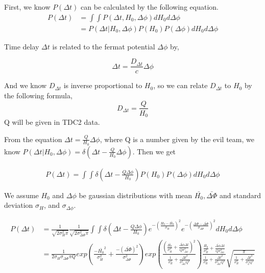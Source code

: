 \documentclass[\docopts]{\docclass}
\begin{document}
First, we know $P(\Delta t)$ can be calculated by the following equation.
\begin{align}
P(\Delta t) &= \int \int P(\Delta t, H_0, \Delta \phi) dH_0 d \Delta \phi \\
&= P(\Delta t | H_0, \Delta \phi) P(H_0)P(\Delta \phi) dH_0 d\Delta \phi
\end{align}

Time delay $\Delta t$ is related to the fermat potential $\Delta \phi$ by, 

\begin{equation}
\Delta t = \frac{D_{\Delta t}}{c} \Delta \phi
\end{equation}

And we know $D_{\Delta t}$ is inverse proportional to $H_0$, so we can relate $D_{\Delta t}$ to $H_0$ by the following formula, 
\begin{equation}
D_{\Delta t}= \frac{Q}{H_0}
\end{equation}
Q will be given in TDC2 data. 

From the equation $\Delta t = \frac{Q}{H_0}\Delta \phi$, where Q is a number given by the evil team, we know 
$P(\Delta t | H_0, \Delta \phi) = \delta(\Delta t - \frac{Q}{H_0}\Delta \phi)$.
Then we get
 
\begin{align}
P(\Delta t) = \int\int \delta(\Delta t - \frac{Q \Delta \phi }{H_0}) P(H_0)P(\Delta \phi) dH_0 d\Delta \phi
\end{align}

We assume $H_0$ and $\Delta \phi$ be gaussian distributions with mean $\bar{H_0}, \bar{\Delta \Phi}$ and standard deviation $\sigma_{H}$, and $\sigma_{\Delta \phi}$. 

\begin{align}
P(\Delta t) &= \frac{1}{\sqrt{2\sigma_{H}^2\pi}}\frac{1}{\sqrt{2\sigma_{\Delta \Phi}^2\pi}}\int\int \delta(\Delta t - \frac{Q \Delta \phi}{H_0}) e^{-(\frac{H_0-\bar{H_0}}{\sigma_{H}})^2} e^{-(\frac{\Delta \Phi-\bar{\Delta \Phi}}{\sigma_{\Delta \Phi}})^2} dH_0 d\Delta \phi \\
&= \frac{1}{2\sigma_{H}\sigma_{\Delta \Phi}\pi Q} exp(\frac{-\bar{H_0}^2}{\sigma_H^2}+\frac{-(\bar{\Delta \Phi})^2}{\sigma_{\Delta \Phi}^2})
exp(\frac{(\frac{\bar{H_0}}{\sigma_H^2}+\frac{\bar{\Delta \phi}\Delta t}{Q\sigma_{\Delta \phi}^2})^2}{\frac{1}{\sigma_H^2}+\frac{\Delta t^2}{\sigma_{\Delta \phi}^2 Q^2}}) \frac{\frac{\bar{H_0}}{\sigma_H^2}+\frac{\bar{\Delta \phi}\Delta t}{Q\sigma_{\Delta \phi}^2}}{\frac{1}{\sigma_H^2}+\frac{\Delta t^2}{\sigma_{\Delta\phi}^2 Q^2}}
\sqrt{\frac{\pi}{\frac{1}{\sigma_H^2}+\frac{\Delta t^2}{\sigma_\phi^2Q^2}}}
\end{align} 
\end{document}
